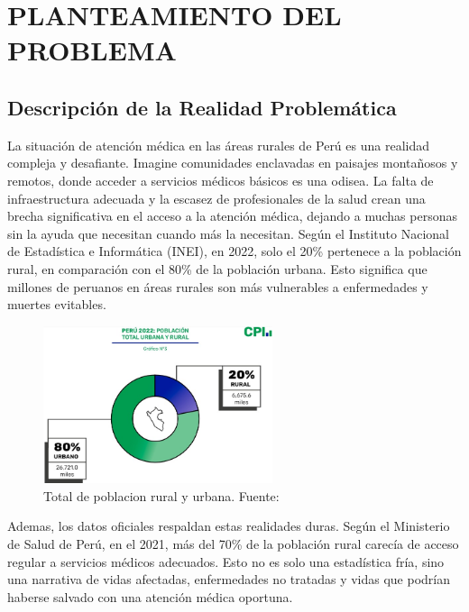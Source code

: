 \chapter{PLANTEAMIENTO DEL PROBLEMA}
\section{Descripción de la Realidad Problemática}

La situación de atención médica en las áreas rurales de Perú es una realidad compleja y desafiante. Imagine comunidades enclavadas en paisajes montañosos y remotos, donde acceder a servicios médicos básicos es una odisea. La falta de infraestructura adecuada y la escasez de profesionales de la salud crean una brecha significativa en el acceso a la atención médica, dejando a muchas personas sin la ayuda que necesitan cuando más la necesitan. Según el Instituto Nacional de Estadística e Informática (INEI), en 2022, solo el 20\% pertenece a la población rural, en comparación con el 80\% de la población urbana. Esto significa que millones de peruanos en áreas rurales son más vulnerables a enfermedades y muertes evitables.

\begin{figure}[h]
	\begin{center}
		\includegraphics[width=0.6\textwidth]{1/figures/INEITOTAL.jpeg}
		\caption{Total de poblacion rural y urbana. Fuente: \cite{gl_inei}}
		\label{1:fig}
	\end{center}
\end{figure}

Ademas, los datos oficiales respaldan estas realidades duras. Según el Ministerio de Salud de Perú, en el 2021, más del 70\% de la población rural carecía de acceso regular a servicios médicos adecuados. Esto no es solo una estadística fría, sino una narrativa de vidas afectadas, enfermedades no tratadas y vidas que podrían haberse salvado con una atención médica oportuna.

